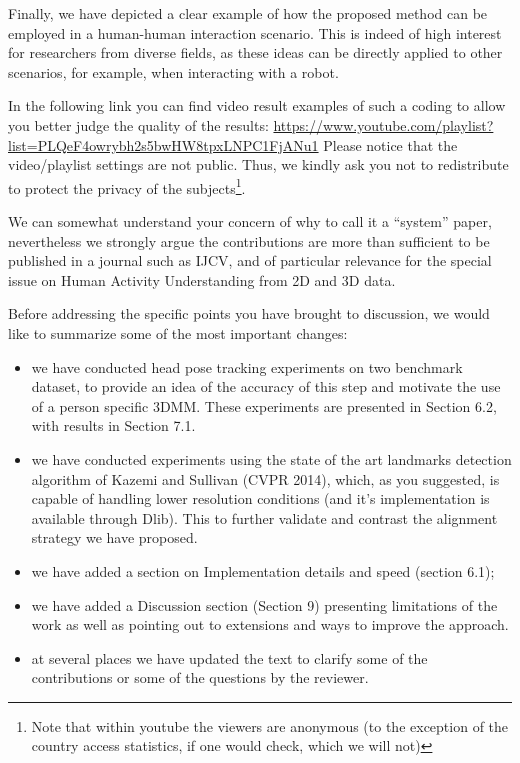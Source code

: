{\vspace*{1mm}

Finally, we have depicted a clear example of how the proposed method can be employed in a human-human interaction
scenario. This is indeed of high interest for researchers from diverse fields, as these ideas can be directly applied
to other scenarios, for example, when interacting with a robot.
%

In the following link you can find video result examples of such a coding to allow you better judge the quality of the results:
\newline
\newline
\url{https://www.youtube.com/playlist?list=PLQeF4owrybh2s5bwHW8tpxLNPC1FjANu1}
\newline
\newline
Please notice that the video/playlist settings are not public. Thus, we kindly ask you not to redistribute to protect the privacy of the subjects\footnote{Note that within youtube the viewers are anonymous (to the exception of the country access statistics, if one would check, which we will not)}.

\vspace*{1mm}


We can somewhat understand your concern of why to call it a ``system'' paper, nevertheless we strongly argue the contributions
are more than sufficient to be published in a journal such as IJCV, and of particular relevance for the special issue
on Human Activity Understanding from 2D and 3D data.

\vspace*{1mm}


Before addressing the specific points you have brought to discussion, we would like to summarize some of the most important changes:
\begin{itemize}
\item we have conducted head pose tracking experiments on two benchmark dataset, to provide an idea of the accuracy of this step
  and motivate the use of a person specific 3DMM. These experiments are presented in Section 6.2, with results in Section 7.1.
\item we have conducted experiments using the state of the art landmarks detection algorithm of Kazemi and Sullivan (CVPR 2014), which, as
you suggested, is capable of handling lower resolution conditions (and it's implementation is available through Dlib). This to
further validate and contrast the alignment strategy we have proposed.
%
\item we have added a section on Implementation details and speed (section 6.1);
\item we have added a Discussion section (Section 9) presenting limitations of the work as well as pointing out to extensions and ways to improve the approach.
\item at several places we have updated the text to clarify some of the contributions or some of the questions by the reviewer.
\end{itemize}

}

